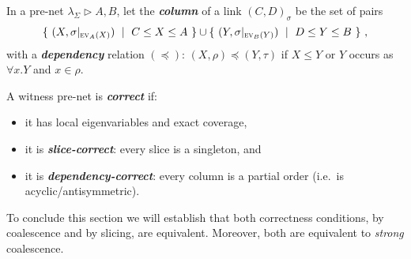 \documentclass[UKenglish]{lipics-v2019}
\newcommand\defn[1]{\textit{\textbf{#1}}}
\newcommand\ex[2][{}]{\textsc{ev}_{#1}(#2)}
\newcommand\+{+}
\renewcommand\*{\times}
\newcommand\sub{\leq}
\newcommand\dep{\preccurlyeq}
\newcommand\net[3]{#1\triangleright #2,#3}
\newcommand\res[1]{|_{#1}}
\newcommand\link[3][\sigma]{(#2,#3)_{#1}}
\begin{document}
\begin{definition}
In a pre-net $\net{\lambda_\Sigma}AB$, let the \defn{column} of a link $\link CD$ be the set of pairs 
\[
	\{~(X,\sigma\res{\ex[A]X})~\mid~C\sub X\sub A~\}\cup\{~(Y,\sigma\res{\ex[B]Y})~\mid~D\sub Y\sub B~\}~,
\]
with a \defn{dependency} relation $(\dep)$: $(X,\rho)\dep(Y,\tau)$ if $X\leq Y$ or $Y$ occurs as $\forall x.Y$ and $x\in\rho$.
\end{definition}

\begin{definition}
A witness pre-net is \defn{correct} if:
\begin{itemize}
\item it has local eigenvariables and exact coverage,
\item it is \defn{slice-correct}: every slice is a singleton, and
\item it is \defn{dependency-correct}: every column is a partial order (i.e.\ is acyclic/antisymmetric).
\end{itemize}
\end{definition}


To conclude this section we will establish that both correctness conditions, by coalescence and by slicing, are equivalent. Moreover, both are equivalent to \emph{strong} coalescence.




\end{document}
